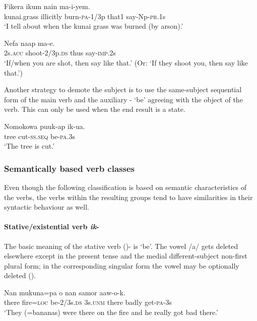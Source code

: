 \ea%
\label{ex:x1009}
\gll Fikera ikum  nain ma-i-yem. \\
kunai.grass illicitly burn-\textsc{pa}-1/3p that1 say-Np-\textsc{pr}.1s\\
\glt`I tell about when the kunai grass was burned (by arson).'
\z

\ea%
\label{ex:x1010}
\gll Nefa  naap ma-e. \\
2s.\textsc{acc} shoot-2/3p.\textsc{ds} thus say-\textsc{imp}.2s\\
\glt`If/when you are shot, then say like that.' (Or: `If they shoot you, then say like that.')
\z

Another strategy to demote the subject is to use the same-subject sequential form of the main verb and the auxiliary - `be' agreeing with the object of the verb. This can only be used when the end result is a state. 

\ea%
\label{ex:x1011}
\gll Nomokowa puuk-ap ik-ua. \\
tree cut-\textsc{ss}.\textsc{seq} be-\textsc{pa}.3s\\
\glt`The tree is cut.'
\z

\subsubsection[Semantically based verb classes ]{Semantically based verb classes} 
{}
Even though the following classification is based on semantic characteristics of the verbs, the verbs within the resulting groups tend to have similarities in their syntactic behaviour as well.

\paragraph[Stative/existential verb ik- ]{Stative/existential verb \textit{ik}-} 
{}
The basic meaning of the stative verb ()- is `be'. The vowel /a/ gets deleted elsewhere except in the present tense and the medial different-subject non-first plural form; in the corresponding singular form the vowel may be optionally deleted (). 

\ea%
\label{ex:x257}
\gll Nan mukuna=pa  o nan samor aaw-o-k. \\
there fire=\textsc{loc} be-2/3s.\textsc{ds} 3s.\textsc{unm} there badly get-\textsc{pa}-3s\\
\glt`They (=bananas) were there on the fire and he really got bad there.'
\z

